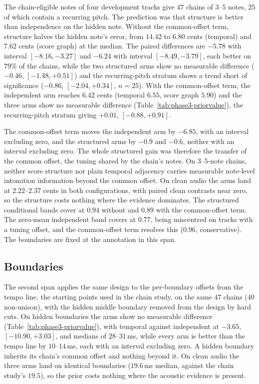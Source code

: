 \documentclass[11pt,a4paper]{report}
\begin{document}
The chain-eligible notes of four development tracks give $47$ chains of
$3$--$5$ notes, $25$ of which contain a recurring pitch. The prediction was
that structure is better than independence on the hidden note. Without the
common-offset term, structure halves the hidden note's error, from $14.42$
to $6.80$ cents (temporal) and $7.62$ cents (score graph) at the median.
The paired differences are $-5.78$ with interval $[-8.16, -3.27]$ and
$-6.24$ with interval $[-8.49, -3.79]$, each better on $79\%$ of the
chains, while the two structured arms show no measurable difference
($-0.46$, $[-1.48, +0.51]$) and the recurring-pitch stratum shows a trend
short of significance ($-0.86$, $[-2.04, +0.34]$, $n=25$). With the
common-offset term, the independent arm reaches $6.42$ cents (temporal $6.55$, score graph
$5.90$) and the three arms show no measurable difference
(Table~\ref{tab:phase3-priorvalue}), the recurring-pitch stratum giving
$+0.01$, $[-0.88, +0.91]$.

The common-offset term moves the independent arm by $-6.85$, with an interval excluding
zero, and the structured arms by $-0.9$ and $-0.6$, neither with an
interval excluding zero. The whole structured gain was therefore the
transfer of the common offset, the tuning shared by the chain's notes. On
$3$--$5$-note chains, neither score structure nor plain temporal adjacency
carries measurable note-level intonation information beyond the common
offset. On clean audio the
arms land at $2.22$--$2.37$ cents in both configurations, with paired clean
contrasts near zero, so the structure costs nothing where the evidence
dominates. The structured conditional bands cover at $0.94$ without and
$0.89$ with the common-offset term. The zero-mean
independent band covers at $0.77$, being miscentred on tracks with a tuning
offset, and the common-offset term resolves this ($0.96$, conservative). The
boundaries are fixed at the annotation in this span.

\subsection{Boundaries}

The second span applies the same design to the per-boundary offsets from
the tempo line, the starting points used in the chain study, on the same
$47$ chains ($40$ non-unison), with the hidden middle boundary removed from
the design by hard cuts. On hidden boundaries the arms show no measurable
difference (Table~\ref{tab:phase3-priorvalue}), with temporal against
independent at $-3.65$, $[-10.90, +3.03]$, and medians of $28$--$31$\,ms,
while every arm is better than the tempo line by $10$--$14$\,ms, each with
an interval excluding zero. A hidden boundary inherits its chain's common
offset and nothing beyond it. On clean audio the three arms land on
identical boundaries ($19.6$\,ms median, against the chain study's $19.5$),
so the prior costs nothing where the acoustic evidence is present.
\end{document}
